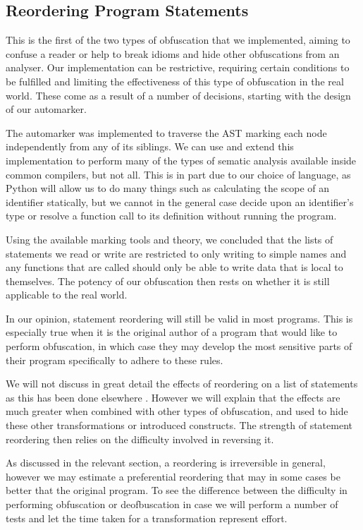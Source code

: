 \documentclass[twoside,a4paper]{report}
\begin{document}
\subsection{Reordering Program Statements}

This is the first of the two types of obfuscation that we implemented, aiming to confuse a reader or help to break idioms and hide
other obfuscations from an analyser. Our implementation can be restrictive, requiring certain conditions to be fulfilled and limiting
the effectiveness of this type of obfuscation in the real world. These come as a result of a number of decisions, starting with the
design of our automarker.

The automarker was implemented to traverse the AST marking each node independently from any of its siblings. We can use and extend this implementation
to perform many of the types of sematic analysis available inside common compilers, but not all. This is in part due to our choice of language, as Python
will allow us to do many things such as calculating the scope of an identifier statically, but we cannot in the general case decide upon an identifier's
type or resolve a function call to its definition without running the program.

Using the available marking tools and theory, we concluded that the lists of statements we read or write are restricted to only writing to simple names
and any functions that are called should only be able to write data that is local to themselves. The potency of our obfuscation then rests on whether
it is still applicable to the real world.

In our opinion, statement reordering will still be valid in most programs. This is especially true when it is the original author of a program that would
like to perform obfuscation, in which case they may develop the most sensitive parts of their program specifically to adhere to these rules.

We will not discuss in great detail the effects of reordering on a list of statements as this has been done elsewhere \cite{taxobftrans}. However we will
explain that the effects are much greater when combined with other types of obfuscation, and used to hide these other transformations or introduced constructs.
The strength of statement reordering then relies on the difficulty involved in reversing it.

As discussed in the relevant section, a reordering is irreversible in general, however we may estimate a preferential reordering that may in some cases be better
that the original program. To see the difference between the difficulty in performing obfuscation or deofbuscation in case we will perform a number of tests and
let the time taken for a transformation represent effort.
\end{document}
